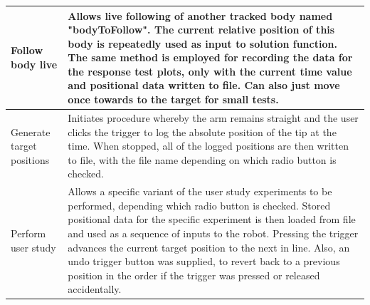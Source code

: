 \documentclass[11pt]{article}
\begin{document}
\begin{center}
\begin{tabularx}{0.95\textwidth}{|p{10em}|X|}
\\
\hline
Follow body live & Allows live following of another tracked body named "bodyToFollow". The current relative position of this body is repeatedly used as input to solution function. The same method is employed for recording the data for the response test plots, only with the current time value and positional data written to file. Can also just move once towards to the target for small tests.
\\
\hline
Generate target \newline positions & Initiates procedure whereby the arm remains straight and the user clicks the trigger to log the absolute position of the tip at the time. When stopped, all of the logged positions are then written to file, with the file name depending on which radio button is checked.
\\
\hline
Perform user study & Allows a specific variant of the user study experiments to be performed, depending which radio button is checked. Stored positional data for the specific experiment is then loaded from file and used as a sequence of inputs to the robot. Pressing the trigger advances the current target position to the next in line. Also, an undo trigger button was supplied, to revert back to a previous position in the order if the trigger was pressed or released accidentally.
\\
\hline
\end{tabularx}
\end{center}




\pagebreak
\end{document}
